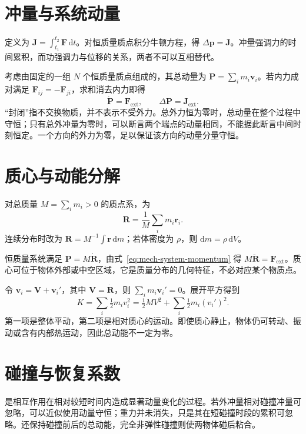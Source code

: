 \documentclass[UTF8,12pt,a4paper,fontset=fandol]{ctexbook}
\begin{document}
\section{冲量与系统动量}
定义为 $\mathbf J=\int_{t_1}^{t_2}\mathbf F\,\mathrm dt$。对恒质量质点积分牛顿方程，得 $\Delta\mathbf p=\mathbf J$。冲量强调力的时间累积，而功强调力与位移的关系，两者不可以互相替代。

考虑由固定的一组 $N$ 个恒质量质点组成的，其总动量为 $\mathbf P=\sum_i m_i\mathbf v_i$。若内力成对满足 $\mathbf F_{ij}=-\mathbf F_{ji}$，求和消去内力即得
\begin{equation}
 \dot{\mathbf P}=\mathbf F_{\mathrm{ext}},\qquad
 \Delta\mathbf P=\mathbf J_{\mathrm{ext}}.
 \label{eq:mech-system-momentum}
\end{equation}
“封闭”指不交换物质，并不表示不受外力。总外力恒为零时，总动量在整个过程中守恒；只有总外冲量为零时，可以断言两个端点的动量相同，不能据此断言中间时刻恒定。一个方向的外力为零，足以保证该方向的动量分量守恒。

\section{质心与动能分解}
\begin{definition}[质心]
对总质量 $M=\sum_i m_i>0$ 的质点系，为
\[
 \mathbf R=\frac1M\sum_i m_i\mathbf r_i.
\]
连续分布时改为 $\mathbf R=M^{-1}\int\mathbf r\,\mathrm dm$；若体密度为 $\rho$，则 $\mathrm dm=\rho\,\mathrm dV$。
\end{definition}
恒质量系统满足 $\mathbf P=M\dot{\mathbf R}$，由式~\eqref{eq:mech-system-momentum} 得 $M\ddot{\mathbf R}=\mathbf F_{\mathrm{ext}}$。质心可位于物体外部或中空区域，它是质量分布的几何特征，不必对应某个物质点。

令 $\mathbf v_i=\mathbf V+\mathbf v_i'$，其中 $\mathbf V=\dot{\mathbf R}$，则 $\sum_i m_i\mathbf v_i'=0$。展开平方得到
\begin{equation}
 K=\sum_i\tfrac12m_i v_i^2=\tfrac12MV^2+\sum_i\tfrac12m_i(v_i')^2.
 \label{eq:mech-koenig}
\end{equation}
第一项是整体平动，第二项是相对质心的运动。即使质心静止，物体仍可转动、振动或含有内部热运动，因此总动能不一定为零。

\section{碰撞与恢复系数}
是相互作用在相对较短时间内造成显著动量变化的过程。若外冲量相对碰撞冲量可忽略，可以近似使用动量守恒；重力并未消失，只是其在短碰撞时段的累积可忽略。还保持碰撞前后的总动能，完全非弹性碰撞则使两物体碰后粘合。
\end{document}
